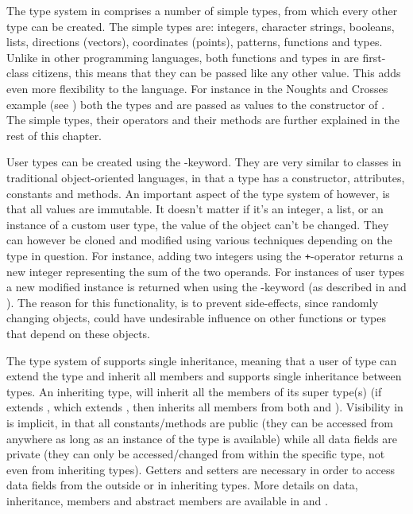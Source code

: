 The type system in \productname{} comprises a number of simple types, from which
every other type can be created. The simple types are: integers, character
strings, booleans, lists, directions (vectors), coordinates (points), patterns,
functions and types. Unlike in other programming languages, both functions and
types in \productname{} are first-class citizens, this means that they can
be passed like any other value. This adds even more
flexibility to the language. For instance in the Noughts and Crosses example
(see ) both the types  and
 are passed as values to the constructor of . The
simple types, their operators and their methods are further explained in the
rest of this chapter.

User types can be created using the -keyword. They are very
similar to classes in traditional object-oriented languages, in that a type has
a constructor, attributes, constants and methods. An important aspect of the
type system of \productname{} however, is that all values are immutable. It
doesn't matter if it's an integer, a list, or an instance of a custom user type,
the value of the object can't be changed. They can however be cloned and
modified using various techniques depending on the type in question. For
instance, adding two integers using the \texttt{+}-operator returns a new
integer representing the sum of the two operands. For instances of user types a
new modified instance is returned when using the -keyword (as
described in  and ). The
reason for this functionality, is to prevent side-effects, since randomly
changing objects, could have undesirable influence on other functions or types
that depend on these objects.

The type system of \productname{} supports single inheritance, meaning that a
user of type  can extend the type  and inherit all members and 
\productname{} supports single inheritance between types. An inheriting type, will
inherit all the members of its super type(s) (if  extends , which
extends , then  inherits all members from both  and
). Visibility in \productname{} is implicit, in that all
constants/methods are public (they can be accessed from anywhere as long as an
instance of the type is available) while all data fields are private (they can
only be accessed/changed from within the specific type, not even from inheriting
types). Getters and setters are necessary in order to access data fields from
the outside or in inheriting types. More details on data, inheritance, members
and abstract members are available in  and
.

